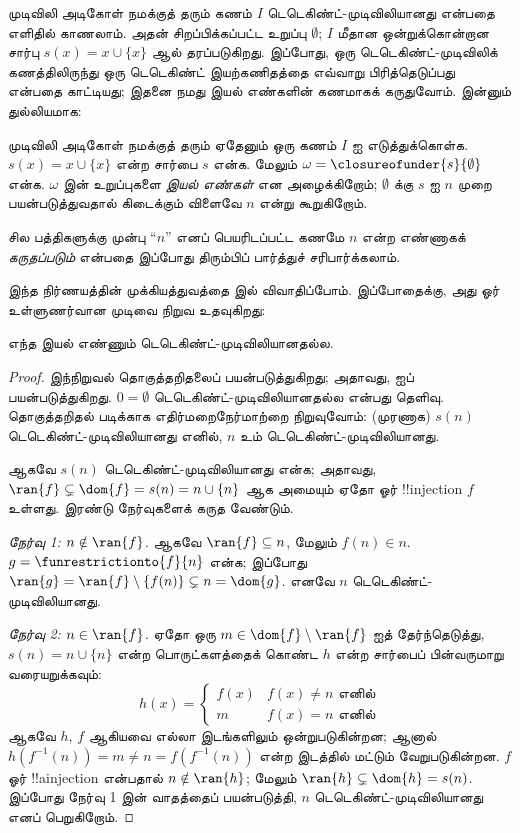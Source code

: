 \documentclass[../../../include/open-logic-section]{subfiles}
\begin{document}
முடிவிலி அடிகோள் நமக்குத் தரும் கணம் $I$ டெடெகிண்ட்-முடிவிலியானது
என்பதை எளிதில் காணலாம். அதன் சிறப்பிக்கப்பட்ட உறுப்பு $\emptyset$;
$I$ மீதான ஒன்றுக்கொன்றான சார்பு $s(x) = x\cup \{x\}$ ஆல் தரப்படுகிறது.
இப்போது, ஒரு டெடெகிண்ட்-முடிவிலிக் கணத்திலிருந்து ஒரு டெடெகிண்ட்
இயற்கணிதத்தை எவ்வாறு பிரித்தெடுப்பது என்பதை
 காட்டியது;
இதனை நமது இயல் எண்களின் கணமாகக் கருதுவோம். இன்னும் துல்லியமாக:
\begin{defn}
முடிவிலி அடிகோள் நமக்குத் தரும் ஏதேனும் ஒரு கணம் $I$ ஐ எடுத்துக்கொள்க.
$s(x) = x \cup \{x\}$ என்ற சார்பை $s$ என்க. மேலும்
$\omega = \closureofunder{s}{\emptyset}$ என்க. $\omega$ இன் உறுப்புகளை
\emph{இயல் எண்கள்} என அழைக்கிறோம்; $\emptyset$ க்கு $s$ ஐ $n$ முறை
பயன்படுத்துவதால் கிடைக்கும் விளைவே $n$ என்று கூறுகிறோம்.
\end{defn}

சில பத்திகளுக்கு முன்பு ``$n$'' எனப் பெயரிடப்பட்ட கணமே $n$ என்ற எண்ணாகக்
\emph{கருதப்படும்} என்பதை இப்போது திரும்பிப் பார்த்துச் சரிபார்க்கலாம்.

இந்த நிர்ணயத்தின் முக்கியத்துவத்தை  இல்
விவாதிப்போம். இப்போதைக்கு, அது ஓர் உள்ளுணர்வான முடிவை நிறுவ உதவுகிறது:

\begin{prop}
எந்த இயல் எண்ணும் டெடெகிண்ட்-முடிவிலியானதல்ல.
\end{prop}

\begin{proof}
இந்நிறுவல் தொகுத்தறிதலைப் பயன்படுத்துகிறது; அதாவது,
 ஐப்
பயன்படுத்துகிறது. $0 = \emptyset$ டெடெகிண்ட்-முடிவிலியானதல்ல என்பது
தெளிவு. தொகுத்தறிதல் படிக்காக எதிர்மறைநேர்மாற்றை நிறுவுவோம்:
(முரணாக) $s(n)$ டெடெகிண்ட்-முடிவிலியானது எனில், $n$ உம்
டெடெகிண்ட்-முடிவிலியானது.

ஆகவே $s(n)$ டெடெகிண்ட்-முடிவிலியானது என்க; அதாவது,
$\ran{f}\subsetneq \dom{f} = s(n) = n \cup \{n\}$ ஆக அமையும் ஏதோ ஓர்
!!{injection} $f$ உள்ளது. இரண்டு நேர்வுகளைக் கருத வேண்டும்.

\emph{நேர்வு 1: $n \notin \ran{f}$.} ஆகவே $\ran{f} \subseteq n$,
மேலும் $f(n) \in n$. $g = \funrestrictionto{f}{n}$ என்க; இப்போது
$\ran{g} = \ran{f} \setminus \{f(n)\} \subsetneq n = \dom{g}$.
எனவே $n$ டெடெகிண்ட்-முடிவிலியானது.

\emph{நேர்வு 2: $n \in \ran{f}$.} ஏதோ ஒரு
$m \in \dom{f} \setminus \ran{f}$ ஐத் தேர்ந்தெடுத்து,
$s(n) = n \cup \{n\}$ என்ற பொருட்களத்தைக் கொண்ட $h$ என்ற சார்பைப்
பின்வருமாறு வரையறுக்கவும்:
\[
h(x) =
	\begin{cases}
		f(x) & f(x) \neq n\text{ எனில்}\\
		m & f(x)=n\text{ எனில்}
	\end{cases}
\]
ஆகவே $h$, $f$ ஆகியவை எல்லா இடங்களிலும் ஒன்றுபடுகின்றன; ஆனால்
$h(f^{-1}(n)) = m \neq n = f(f^{-1}(n))$ என்ற இடத்தில் மட்டும்
வேறுபடுகின்றன. $f$ ஓர் !!a{injection} என்பதால் $n \notin \ran{h}$;
மேலும் $\ran{h} \subsetneq \dom{h} = s(n)$. இப்போது நேர்வு 1 இன்
வாதத்தைப் பயன்படுத்தி, $n$ டெடெகிண்ட்-முடிவிலியானது எனப் பெறுகிறோம்.
\end{proof}
\end{document}
